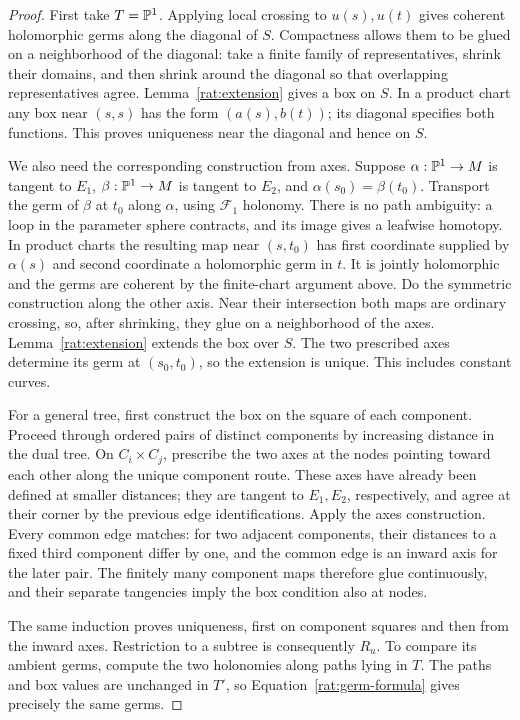\begin{proof}
First take $T=\mathbb P^1$. Applying local crossing to $u(s),u(t)$ gives
coherent holomorphic germs along the diagonal of $S$. Compactness
allows them to be glued on a neighborhood of the diagonal: take a
finite family of representatives, shrink their domains, and then
shrink around the diagonal so that overlapping representatives agree.
Lemma~\ref{rat:extension} gives a box on $S$. In a product chart any
box near $(s,s)$ has the form $(a(s),b(t))$; its diagonal specifies
both functions. This proves uniqueness near the diagonal and hence
on $S$.

We also need the corresponding construction from axes. Suppose
$\alpha:\mathbb P^1\to M$ is tangent to $E_1$,
$\beta:\mathbb P^1\to M$ is tangent to $E_2$, and
$\alpha(s_0)=\beta(t_0)$. Transport the germ of $\beta$ at $t_0$
along $\alpha$, using $\mathcal F_1$ holonomy. There is no path
ambiguity: a loop in the parameter sphere contracts, and its image
gives a leafwise homotopy. In product charts the resulting map near
$(s,t_0)$ has first coordinate supplied by $\alpha(s)$ and second
coordinate a holomorphic germ in $t$. It is jointly holomorphic and
the germs are coherent by the finite-chart argument above. Do the
symmetric construction along the other axis. Near their intersection
both maps are ordinary crossing, so, after shrinking, they glue on a
neighborhood of the axes. Lemma~\ref{rat:extension} extends the box
over $S$. The two prescribed axes determine its germ at $(s_0,t_0)$,
so the extension is unique. This includes constant curves.

For a general tree, first construct the box on the square of each
component. Proceed through ordered pairs of distinct components by
increasing distance in the dual tree. On $C_i\times C_j$, prescribe
the two axes at the nodes pointing toward each other along the unique
component route. These axes have already been defined at smaller
distances; they are tangent to $E_1,E_2$, respectively, and agree at
their corner by the previous edge identifications. Apply the axes
construction. Every common edge matches: for two adjacent components,
their distances to a fixed third component differ by one, and the
common edge is an inward axis for the later pair. The finitely many
component maps therefore glue continuously, and their separate
tangencies imply the box condition also at nodes.

The same induction proves uniqueness, first on component squares and
then from the inward axes. Restriction to a subtree is consequently
$R_u$. To compare its ambient germs, compute the two holonomies along
paths lying in $T$. The paths and box values are unchanged in $T'$,
so Equation~\eqref{rat:germ-formula} gives precisely the same germs.
\end{proof}
